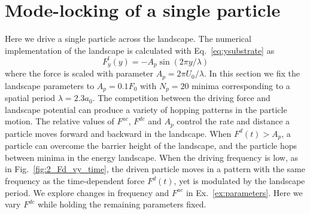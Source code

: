 \documentclass[twocolumn,preprintnumbers,amsmath,amssymb,aps,prb]{revtex4}
\begin{document}
\section{Mode-locking of a single particle}
\label{sec:results}
Here we drive 
a single particle 
across the landscape. 
The numerical implementation of the landscape 
is calculated with Eq.~\ref{eq:ysubstrate} as 
\begin{equation}
  \label{eq:force}
  F^l_y(y) = -A_{p} \sin{(2 \pi y / \lambda)} 
\end{equation}
where the force is scaled with parameter $A_{p} = 2\pi U_0/\lambda$.
In this section we fix the landscape parameters
to $A_{p} = 0.1 F_0$ 
with $N_p=20$ minima 
corresponding to a spatial period $\lambda = 2.3 a_0$.
The competition between the driving force and landscape potential
can produce a variety of hopping patterns in the particle motion. 
The relative values of $F^{ac}$, $F^{dc}$ and $A_p$
control the rate and distance a  particle moves 
forward and backward in the landscape.
When $F^d(t) > A_p$, a particle can 
overcome the barrier height of the landscape,
and 
the particle hops between minima in the energy landscape.
When the driving frequency is low,
as in Fig.~\ref{fig:2_Fd_vy_time},  
the driven particle 
moves 
in a pattern 
with the same frequency 
as the time-dependent force $F^d(t)$,
yet is modulated by the landscape period.
We explore changes in frequency and $F^{ac}$ 
in Ex.~\ref{ex:parameters}.
Here we vary $F^{dc}$ 
while holding the remaining parameters fixed.
\end{document}
